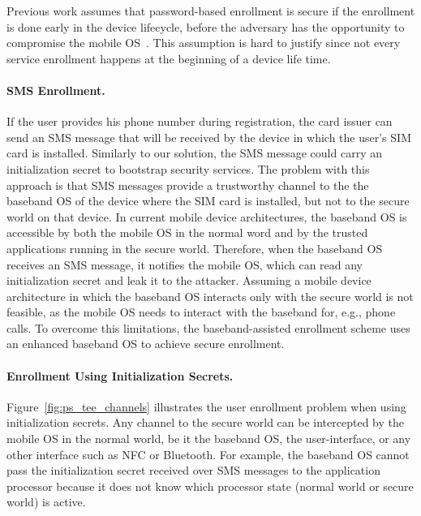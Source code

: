 Previous work assumes that password-based enrollment is secure if the enrollment
is done early in the device lifecycle, before the adversary has the opportunity
to compromise the mobile OS~\cite{czeskis12ccs,kari11stc}. This assumption is
hard to justify since not every service enrollment happens at the beginning of a
device life time.

\paragraph{SMS Enrollment.}

If the user provides his phone number during registration, the card issuer can
send an SMS message that will be received by the device in which the user's SIM
card is installed. Similarly to our solution, the SMS message could carry an
initialization secret to bootstrap security services. The problem with this
approach is that SMS messages provide a trustworthy channel to the the baseband
OS of the device where the SIM card is installed, but not to the secure world on
that device.  In current mobile device architectures, the baseband OS is
accessible by both the mobile OS in the normal word and by the trusted
applications running in the secure world. Therefore, when the baseband OS
receives an SMS message, it notifies the mobile OS, which can read any
initialization secret and leak it to the attacker. Assuming a mobile device
architecture in which the baseband OS interacts only with the secure world is
not feasible, as the mobile OS needs to interact with the baseband for, e.g.,
phone calls. To overcome this limitations, the baseband-assisted enrollment
scheme uses an enhanced baseband OS to achieve secure enrollment.

\paragraph{Enrollment Using Initialization Secrets.}

Figure~\ref{fig:ps_tee_channels} illustrates the user enrollment problem when
using initialization secrets. Any channel to the secure world can be
intercepted by the mobile OS in the normal world, be it the baseband OS, the
user-interface, or any other interface such as NFC or Bluetooth. For example,
the baseband OS cannot pass the initialization secret received over SMS
messages to the application processor because it does not know which processor
state (normal world or secure world) is active.

